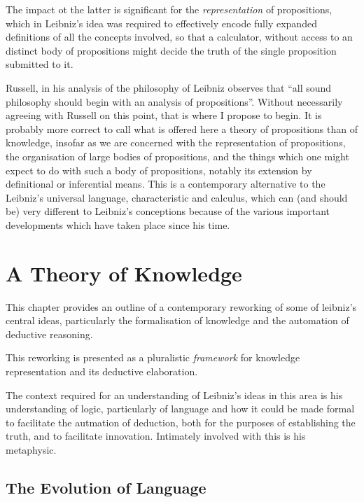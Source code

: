 The impact ot the latter is significant for the \emph{representation} of propositions, which
in Leibniz's idea was required to effectively encode fully expanded definitions of all the
concepts involved, so that a calculator, without access to an distinct body of propositions
might decide the truth of the single proposition submitted to it.


Russell, in his analysis of the philosophy of Leibniz observes that ``all sound philosophy should begin with an analysis of propositions''.
Without necessarily agreeing with Russell on this point, that is where I propose to begin.
It is probably more correct to call what is offered here a theory of propositions than of knowledge,
insofar as we are concerned with the representation of propositions, the organisation of large bodies of
propositions, and the things which one might expect to do with such a body of propositions, notably
its extension by definitional or inferential means.
This is a contemporary alternative to the Leibniz's universal language, characteristic and calculus,
which can (and should be) very different to Leibniz's conceptions because of the various important
developments which have taken place since his time.

\chapter{A Theory of Knowledge}\label{TheoryOfKnowledge}

This chapter provides an outline of a contemporary reworking of some of leibniz's central
ideas, particularly the formalisation of knowledge and the automation of deductive reasoning.

This reworking is presented as a pluralistic \emph{framework} for knowledge representation and its
deductive elaboration.

The context required for an understanding of Leibniz's ideas in this area is his
understanding of logic, particularly of language and how it could be made formal
to facilitate the autmation of deduction, both for the purposes of establishing
the truth, and to facilitate innovation.
Intimately involved with this is his metaphysic.

\section{The Evolution of Language}
